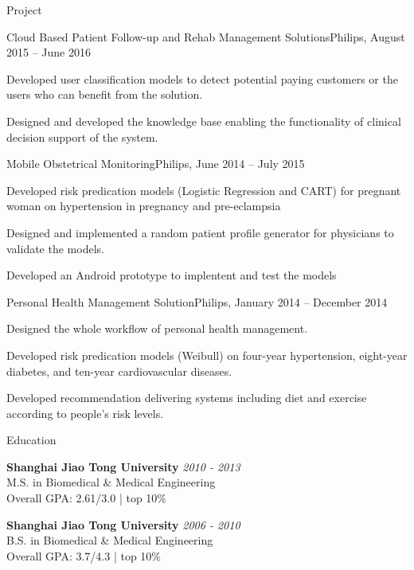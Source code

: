 \documentclass{resume} %
\begin{document}
\begin{rSection}{Project}

\begin{rSubsection}{Cloud Based Patient Follow-up and Rehab Management Solutions}{}{Philips, August 2015 – June 2016}{}
\item Developed user classification models to detect potential paying customers or the users who can benefit from the solution.
\item Designed and developed the knowledge base enabling the functionality of clinical decision support of the system.
\end{rSubsection}


\begin{rSubsection}{Mobile Obstetrical Monitoring}{}{Philips, June 2014 – July 2015}{}
\item Developed risk predication models (Logistic Regression and CART) for pregnant woman on hypertension in pregnancy and pre-eclampsia
\item Designed and implemented a random patient profile generator for physicians to validate the models.
\item Developed an Android prototype to implentent and test the models
\end{rSubsection}


\begin{rSubsection}{Personal Health Management Solution}{}{Philips, January 2014 – December 2014}{}
\item Designed the whole workflow of personal health management.
\item Developed risk predication models (Weibull) on four-year hypertension, eight-year diabetes, and ten-year cardiovascular diseases.
\item Developed recommendation delivering systems including diet and exercise according to people's risk levels.
\end{rSubsection}

\end{rSection}


\begin{rSection}{Education}

{\bf Shanghai Jiao Tong University} \hfill {\em 2010 - 2013} \\ 
M.S. in Biomedical \& Medical Engineering \\
Overall GPA: 2.61/3.0 | top 10\%

{\bf Shanghai Jiao Tong University} \hfill {\em 2006 - 2010} \\ 
B.S. in Biomedical \& Medical Engineering \\
Overall GPA: 3.7/4.3 | top 10\%

\end{rSection}
\end{document}
